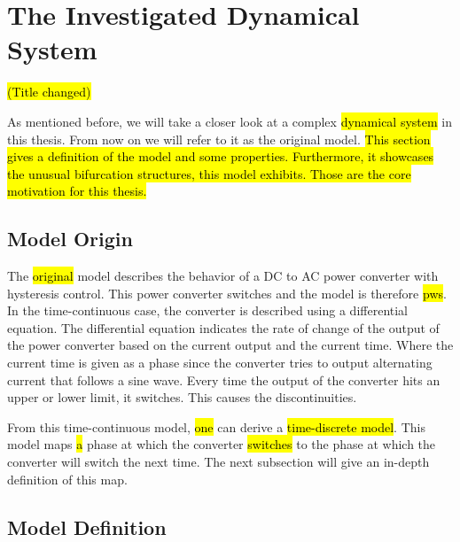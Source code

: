 \section{The Investigated Dynamical System}
\label{sec:state.og}

\hl{(Title changed)}

As mentioned before, we will take a closer look at a complex \hl{dynamical system} in this thesis.
From now on we will refer to it as the original model.
\hl{
	This section gives a definition of the model and some properties.
	Furthermore, it showcases the unusual bifurcation structures, this model exhibits.
	Those are the core motivation for this thesis.
}


\subsection{Model Origin}
\label{sec:state.og.orig}

The \hl{original} model describes the behavior of a DC to AC power converter with hysteresis control.
This power converter switches and the model is therefore \hl{\gls{pws}}.
In the time-continuous case, the converter is described using a differential equation.
The differential equation indicates the rate of change of the output of the power converter based on the current output and the current time.
Where the current time is given as a phase since the converter tries to output alternating current that follows a sine wave.
Every time the output of the converter hits an upper or lower limit, it switches.
This causes the discontinuities.

From this time-continuous model, \hl{one} can derive a \hl{time-discrete model}.
This model maps \hl{a} phase at which the converter \hl{switches} to the phase at which the converter will switch the next time.
The next subsection will give an in-depth definition of this map.

\subsection{Model Definition}
\label{sec:state.og.def}

